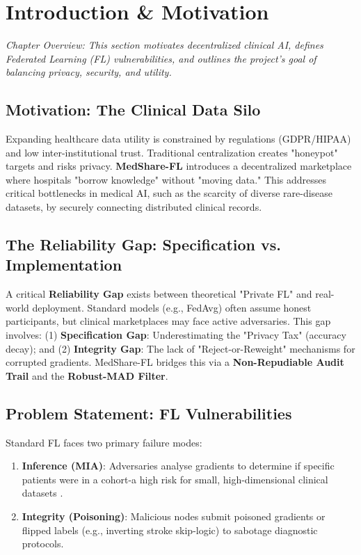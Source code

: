 \documentclass[10pt, a4paper, twocolumn]{article}
\begin{document}
\section{Introduction \& Motivation}

\textit{Chapter Overview: This section motivates decentralized clinical AI, defines Federated Learning (FL) vulnerabilities, and outlines the project's goal of balancing privacy, security, and utility.}

\subsection{Motivation: The Clinical Data Silo}
Expanding healthcare data utility is constrained by regulations (GDPR/HIPAA) and low inter-institutional trust. Traditional centralization creates "honeypot" targets and risks privacy. \textbf{MedShare-FL} introduces a decentralized marketplace where hospitals "borrow knowledge" without "moving data." This addresses critical bottlenecks in medical AI, such as the scarcity of diverse rare-disease datasets, by securely connecting distributed clinical records.

\subsection{The Reliability Gap: Specification vs. Implementation}
A critical \textbf{Reliability Gap} exists between theoretical "Private FL" and real-world deployment. Standard models (e.g., FedAvg) often assume honest participants, but clinical marketplaces may face active adversaries. This gap involves: (1) \textbf{Specification Gap}: Underestimating the "Privacy Tax" (accuracy decay); and (2) \textbf{Integrity Gap}: The lack of "Reject-or-Reweight" mechanisms for corrupted gradients. MedShare-FL bridges this via a \textbf{Non-Repudiable Audit Trail} and the \textbf{Robust-MAD Filter}.

\subsection{Problem Statement: FL Vulnerabilities}
Standard FL faces two primary failure modes:
\begin{enumerate}[leftmargin=*, nosep]
    \item \textbf{Inference (MIA)}: Adversaries analyse gradients to determine if specific patients were in a cohort-a high risk for small, high-dimensional clinical datasets \cite{nasr2019}.
    \item \textbf{Integrity (Poisoning)}: Malicious nodes submit poisoned gradients or flipped labels (e.g., inverting stroke skip-logic) to sabotage diagnostic protocols.
\end{enumerate}
\end{document}
